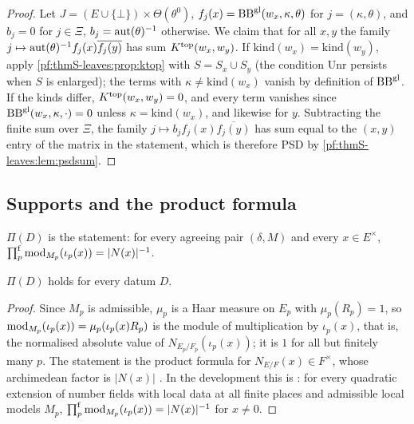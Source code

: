 \begin{proof}
Let $J=(E\cup\{\bot\})\times\Theta(\theta^0)$, $f_j(x)=\mathrm{BB}^{\mathrm{gl}}(w_x,\kappa,\theta)$ for $j=(\kappa,\theta)$, and
$b_j=0$ for $j\in\Xi$, $b_j=\mathrm{aut}(\theta)^{-1}$ otherwise. We claim that for all $x,y$ the family
$j\mapsto\mathrm{aut}(\theta)^{-1}f_j(x)\overline{f_j(y)}$ has sum $K^{\mathrm{top}}(w_x,w_y)$. If
$\mathrm{kind}(w_x)=\mathrm{kind}(w_y)$, apply \cref{pf:thmS-leaves:prop:ktop} with $S=S_x\cup S_y$ (the condition $\mathrm{Unr}$
persists when $S$ is enlarged); the terms with $\kappa\ne\mathrm{kind}(w_x)$ vanish by definition of $\mathrm{BB}^{\mathrm{gl}}$. If the
kinds differ, $K^{\mathrm{top}}(w_x,w_y)=0$, and every term vanishes since $\mathrm{BB}^{\mathrm{gl}}(w_x,\kappa,\cdot)=0$ unless
$\kappa=\mathrm{kind}(w_x)$, and likewise for $y$. Subtracting the finite sum over $\Xi$, the family
$j\mapsto b_jf_j(x)\overline{f_j(y)}$ has sum equal to the $(x,y)$ entry of the matrix in the statement, which is
therefore PSD by \cref{pf:thmS-leaves:lem:psdsum}.
\end{proof}

\subsection{Supports and the product formula}\label{pf:thmS-leaves:ss:support}

\begin{definition}\label{pf:thmS-leaves:def:normprod}
$\Pi(D)$ is the statement: for every agreeing pair $(\delta,M)$ and every $x\in E^\times$,
$\prod^{\mathrm f}_{p}\mathrm{mod}_{M_p}(\iota_p(x))=|N(x)|^{-1}$.
\end{definition}

\begin{lemma}\label{pf:thmS-leaves:lem:normprod}
$\Pi(D)$ holds for every datum $D$.
\end{lemma}

\begin{proof}
Since $M_p$ is admissible, $\mu_p$ is a Haar measure on $E_p$ with $\mu_p(R_p)=1$, so
$\mathrm{mod}_{M_p}(\iota_p(x))=\mu_p(\iota_p(x)R_p)$ is the module of multiplication by $\iota_p(x)$, that is, the
normalised absolute value of $N_{E_p/F_p}(\iota_p(x))$; it is $1$ for all but finitely many $p$. The statement is the
product formula for $N_{E/F}(x)\in F^\times$, whose archimedean factor is $|N(x)|$ \cite[Ch.~III, \S1]{Neukirch1999}. In
the development this is : for every quadratic extension of number fields with local data at
all finite places and admissible local models $M_p$, $\prod^{\mathrm f}_p\mathrm{mod}_{M_p}(\iota_p(x))=|N(x)|^{-1}$ for
$x\ne0$.
\end{proof}

